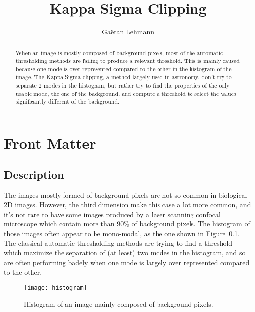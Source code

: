 \documentclass{InsightArticle}
\title{Kappa Sigma Clipping}
\author{Ga\"etan Lehmann}
\begin{document}
\maketitle

\ifhtml
\chapter*{Front Matter\label{front}}
\fi


\begin{abstract}
\noindent
When an image is mostly composed of background pixels, most of the automatic
thresholding methods are failing to produce a relevant threshold. This is mainly
caused because one mode is over represented compared to the other in the histogram
of the image. The Kappa-Sigma clipping, a method largely used in astronomy, don't
try to separate 2 modes in the histogram, but rather try to find the properties of
the only usable mode, the one of the background, and compute a threshold to select
the values significantly different of the background.
\end{abstract}


\section{Description}
The images mostly formed of background pixels are not so common in biological 2D images.
However, the third dimension make this case a lot more common, and it's not rare to
have some images produced by a laser scanning confocal microscope which contain more than 90\%
of background pixels. The histogram of those images often appear to be mono-modal, as
the one shown in Figure~\ref{histogram}. The classical automatic thresholding methods
are trying to find a threshold which maximize the separation of (at least) two modes in
the histogram, and so are often performing badely when one mode is largely over represented
compared to the other.


\begin{figure}[htbp]
\centering
\texttt{[image: histogram]}
\caption{Histogram of an image mainly composed of background pixels.\label{histogram}}
\end{figure}


\end{document}
